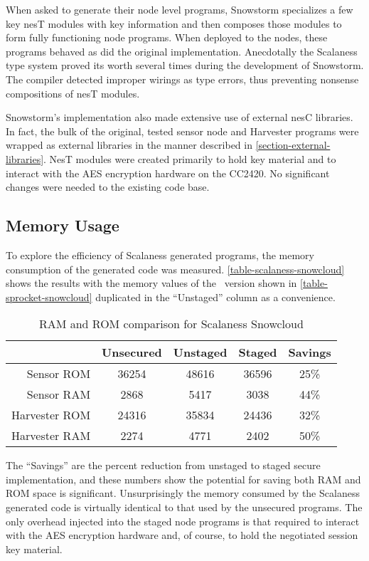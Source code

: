 When asked to generate their node level programs, Snowstorm specializes a few key nesT modules
with key information and then composes those modules to form  fully functioning node programs.
When deployed to the nodes, these programs behaved as did the original implementation.
Anecdotally the Scalaness type system proved its worth several times during the development of
Snowstorm. The compiler detected improper wirings as type errors, thus preventing nonsense
compositions of nesT modules. 

Snowstorm's implementation also made extensive use of external nesC libraries. In fact, the bulk
of the original, tested sensor node and Harvester programs were wrapped as external libraries in
the manner described in \autoref{section-external-libraries}. NesT modules were created
primarily to hold key material and to interact with the AES encryption hardware on the CC2420.
No significant changes were needed to the existing code base.

\subsection{Memory Usage}

To explore the efficiency of Scalaness generated programs, the memory consumption of the
generated code was measured. \autoref{table-scalaness-snowcloud} shows the results with the
memory values of the \Sprocket\ version shown in \autoref{table-sprocket-snowcloud} duplicated
in the ``Unstaged'' column as a convenience.

\begin{table}[h]
\centering \newcommand\T{\rule{0pt}{2.1ex}}
\caption{RAM and ROM comparison for Scalaness Snowcloud} {
\begin{tabular}{|r||c|c|c|c|} \hline \hline
              & Unsecured & Unstaged & Staged & Savings\\ \hline
Sensor ROM    &     36254 &    48616 &  36596 & 25\% \\
Sensor RAM    &      2868 &     5417 &   3038 & 44\% \\ \hline
Harvester ROM &     24316 &    35834 &  24436 & 32\% \\
Harvester RAM &      2274 &     4771 &   2402 & 50\% \\ \hline
\end{tabular}
}
\label{table-scalaness-snowcloud}
\end{table}

The ``Savings'' are the percent reduction from unstaged to staged secure implementation, and
these numbers show the potential for saving both RAM and ROM space is significant.
Unsurprisingly the memory consumed by the Scalaness generated code is virtually identical to
that used by the unsecured programs. The only overhead injected into the staged node programs is
that required to interact with the AES encryption hardware and, of course, to hold the
negotiated session key material.

